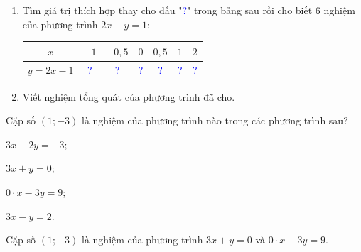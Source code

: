 \begin{bt}
	\begin{enumerate}
	\item Tìm giá trị thích hợp thay cho dấu "\textcolor{blue}{?}" trong bảng sau rồi cho biết $6$ nghiệm của phương trình $2x-y=1$:
	\begin{center}
	\begin{tabular}{|c|c|c|c|c|c|c|}
	\hline
	$x$&$-1$& $-0{,}5$&$0$&$0{,}5$&$1$&$2$\\
	\hline
	$y=2x-1$&\textcolor{blue}{?}&\textcolor{blue}{?}&\textcolor{blue}{?}&\textcolor{blue}{?}&\textcolor{blue}{?}&\textcolor{blue}{?}\\
	\hline
	\end{tabular}
	\end{center}
	\item Viết nghiệm tổng quát của phương trình đã cho.
	\end{enumerate}
\end{bt}
\begin{bt}%
	Cặp số $(1;-3)$ là nghiệm của phương trình nào trong các phương trình sau?
	\begin{enumEX}{4}
	\item $3x - 2y = - 3$;
	\item $3x + y = 0$;
	\item $0\cdot x -3y = 9$;
	\item $3x - y = 2$.
	\end{enumEX}
	\loigiai
	{
	Cặp số $(1;-3)$ là nghiệm của phương trình $3x + y = 0$ và $0\cdot x -3y = 9$.
	}
\end{bt}
